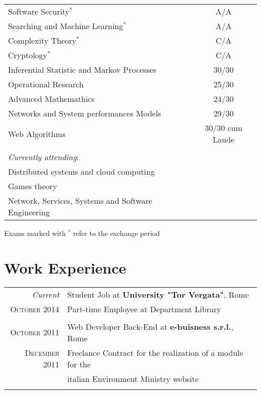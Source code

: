 \documentclass[a4paper,10pt]{article} %
\begin{document}
\begin{tabular}{lc}
Software Security$^*$  & A/A \\
Searching and Machine Learning$^*$ & A/A \\
Complexity Theory$^*$ & C/A \\
Cryptology$^*$ & C/A \\
Inferential Statistic and Markov Processes & 30/30 \\
Operational Research & 25/30 \\
Advanced Mathemathics & 24/30 \\
Networks and System performances Models & 29/30 \\
Web Algorithms & 30/30 cum Laude \\
\\
\textit{Currently attending}:\\
Distributed systems and cloud computing\\
Games theory\\
Network, Services, Systems and Software Engineering\\
\end{tabular}

\bigskip
Exams marked with $^*$ refer to the exchange period




\section{Work Experience}

\begin{tabular}{r|p{11cm}}
\emph{Current} & Student Job at  \textbf{University "Tor Vergata"}, Rome
\\ \textsc{October} 2014 & Part-time Employee at Department Library \\
\multicolumn{2}{c}{} \\


\textsc{October} 2011 & Web Developer Back-End at  \textbf{e-buisness s.r.l.}, Rome
\\ \textsc{December} 2011 & Freelance Contract  for the realization of a module for the 
\\ &  italian Environment Ministry website \\
\multicolumn{2}{c}{} \\

\end{tabular}
\end{document}
